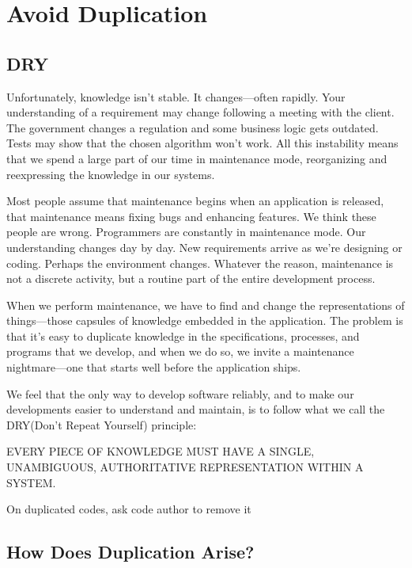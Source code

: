 
\chapter{Avoid Duplication}

\section{DRY}

Unfortunately, knowledge isn't stable. It changes—often rapidly. Your understanding of a requirement may change following a meeting with the client. The government changes a regulation and some business logic gets outdated. Tests may show that the chosen algorithm won't work. All this instability means that we spend a large part of our time in maintenance mode, reorganizing and reexpressing the knowledge in our systems.

Most people assume that maintenance begins when an application is released, that maintenance means fixing bugs and enhancing features. We think these people are wrong. Programmers are constantly in maintenance mode. Our understanding changes day by day. New requirements arrive as we're designing or coding. Perhaps the environment changes. Whatever the reason, maintenance is not a discrete activity, but a routine part of the entire development process.

When we perform maintenance, we have to find and change the representations of things—those capsules of knowledge embedded in the application. The problem is that it's easy to duplicate knowledge in the specifications, processes, and programs that we develop, and when we do so, we invite a maintenance nightmare—one that starts well before the application ships.

We feel that the only way to develop software reliably, and to make our developments easier to understand and maintain, is to follow what we call the DRY(Don't Repeat Yourself) principle:

\begin{remark}
EVERY PIECE OF KNOWLEDGE MUST HAVE A SINGLE, UNAMBIGUOUS, AUTHORITATIVE REPRESENTATION WITHIN A SYSTEM.
\end{remark}

\begin{marker}
On duplicated codes, ask code author to remove it
\end{marker}

\section{How Does Duplication Arise?}

